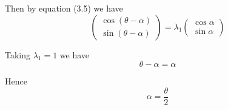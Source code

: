 \documentclass[12pt]{article}
\begin{document}
Then by equation (3.5) we have
\begin{equation*}
\begin{pmatrix}
\cos(\theta-\alpha)
\\
\sin(\theta-\alpha)
\end{pmatrix}
=\lambda_1\begin{pmatrix}\cos\alpha\\\sin\alpha\end{pmatrix}
\end{equation*}

Taking $\lambda_1=1$ we have
\begin{equation*}
\theta-\alpha=\alpha
\end{equation*}

Hence
\begin{equation*}
\alpha=\frac{\theta}{2}
\end{equation*}
\end{document}
